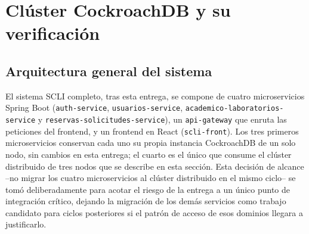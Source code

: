 \documentclass[10pt,twocolumn]{article}
\begin{document}
\section{Clúster CockroachDB y su verificación}
\label{sec:cluster}

\subsection{Arquitectura general del sistema}

El sistema SCLI completo, tras esta entrega, se compone de cuatro
microservicios Spring Boot (\texttt{auth-service},
\texttt{usuarios-service}, \texttt{academico-laboratorios-service} y
\texttt{reservas-solicitudes-service}), un \texttt{api-gateway} que
enruta las peticiones del frontend, y un frontend en React
(\texttt{scli-front}). Los tres primeros microservicios conservan cada
uno su propia instancia CockroachDB de un solo nodo, sin cambios en esta
entrega; el cuarto es el único que consume el clúster distribuido de tres
nodos que se describe en esta sección. Esta decisión de alcance --no migrar
los cuatro microservicios al clúster distribuido en el mismo ciclo-- se
tomó deliberadamente para acotar el riesgo de la entrega a un único punto
de integración crítico, dejando la migración de los demás servicios como
trabajo candidato para ciclos posteriores si el patrón de acceso de esos
dominios llegara a justificarlo.
\end{document}

